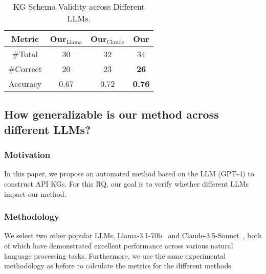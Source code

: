 \begin{table}[t]
\centering
\caption{KG Schema Validity across Different LLMs.}
\label{tab: res41}
\begin{tabular}{c|c|c|c}
\hline
Metric       &  Our$_{\text{Llama}}$  & Our$_{\text{Claude}}$        & Our     \\ \hline
\#Total      &  30                     &  32                          & 34      \\ \hline
\#Correct    &  20                    &  23                          & \textbf{26}      \\ \hline
Accuracy     &  0.67                  & 0.72                         & \textbf{0.76}     \\ \hline
\end{tabular}
\end{table}



\subsection{How generalizable is our method across different LLMs?}\label{sec: RQ5}
\subsubsection{Motivation}
In this paper, we propose an automated method based on the LLM (GPT-4) to construct API KGs.
For this RQ, our goal is to verify whether different LLMs impact our method.

\subsubsection{Methodology}
We select two other popular LLMs, Llama-3.1-70b~\cite{Llama-3.1} and Claude-3.5-Sonnet~\cite{claude-3-5-sonnet}, both of which have demonstrated excellent performance across various natural language processing tasks.
Furthermore, we use the same experimental methodology as before to calculate the metrics for the different methods.

